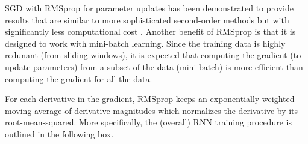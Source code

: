 SGD with RMSprop \cite{Tieleman2012} for parameter updates has been demonstrated to provide results that are similar to more sophisticated second-order methods but with significantly less computational cost \cite{Dauphin}.
%
Another benefit of RMSprop is that it is designed to work with mini-batch learning.
%
Since the training data is highly redunant (from sliding windows), it is expected that computing the gradient (to update parameters) from a subset of the data (mini-batch) is more efficient than computing the gradient for all the data.


For each derivative in the gradient, RMSprop keeps an exponentially-weighted moving average of derivative magnitudes which normalizes the derivative by its root-mean-squared.
%
More specifically, the (overall) RNN training procedure is outlined in the following box.

